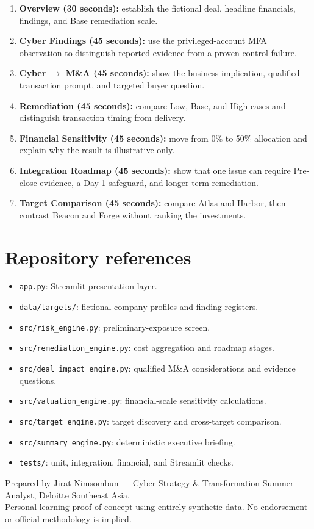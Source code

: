 \documentclass[11pt,a4paper]{article}
\begin{document}
\begin{enumerate}
  \item \textbf{Overview (30 seconds):} establish the fictional deal, headline financials, findings, and Base remediation scale.
  \item \textbf{Cyber Findings (45 seconds):} use the privileged-account MFA observation to distinguish reported evidence from a proven control failure.
  \item \textbf{Cyber $\rightarrow$ M\&A (45 seconds):} show the business implication, qualified transaction prompt, and targeted buyer question.
  \item \textbf{Remediation (45 seconds):} compare Low, Base, and High cases and distinguish transaction timing from delivery.
  \item \textbf{Financial Sensitivity (45 seconds):} move from 0\% to 50\% allocation and explain why the result is illustrative only.
  \item \textbf{Integration Roadmap (45 seconds):} show that one issue can require Pre-close evidence, a Day 1 safeguard, and longer-term remediation.
  \item \textbf{Target Comparison (45 seconds):} compare Atlas and Harbor, then contrast Beacon and Forge without ranking the investments.
\end{enumerate}

\section{Repository references}

\begin{itemize}
  \item \texttt{app.py}: Streamlit presentation layer.
  \item \texttt{data/targets/}: fictional company profiles and finding registers.
  \item \texttt{src/risk\_engine.py}: preliminary-exposure screen.
  \item \texttt{src/remediation\_engine.py}: cost aggregation and roadmap stages.
  \item \texttt{src/deal\_impact\_engine.py}: qualified M\&A considerations and evidence questions.
  \item \texttt{src/valuation\_engine.py}: financial-scale sensitivity calculations.
  \item \texttt{src/target\_engine.py}: target discovery and cross-target comparison.
  \item \texttt{src/summary\_engine.py}: deterministic executive briefing.
  \item \texttt{tests/}: unit, integration, financial, and Streamlit checks.
\end{itemize}

\vfill
\begin{center}
\small\color{darkgray}
Prepared by Jirat Nimsombun --- Cyber Strategy \& Transformation Summer Analyst, Deloitte Southeast Asia.\\
Personal learning proof of concept using entirely synthetic data. No endorsement or official methodology is implied.
\end{center}
\end{document}

